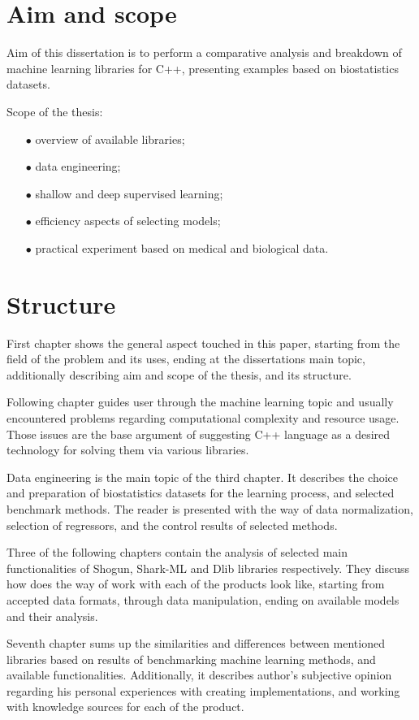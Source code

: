 \section{Aim and scope} %

Aim of this dissertation is to perform a comparative analysis and breakdown of machine learning libraries for C++, presenting examples based on biostatistics datasets.

Scope of the thesis:

\begin{itemize}
    \item [$\bullet$] overview of available libraries;
    \item [$\bullet$] data engineering;
    \item [$\bullet$] shallow and deep supervised learning;
    \item [$\bullet$] efficiency aspects of selecting models;
    \item [$\bullet$] practical experiment based on medical and biological data.
\end{itemize}

\section{Structure} %

First chapter shows the general aspect touched in this paper, starting from the field of the problem and its uses, ending at the dissertations main topic, additionally describing aim and scope of the thesis, and its structure. 

Following chapter guides user through the machine learning topic and usually encountered problems regarding computational complexity and resource usage. Those issues are the base argument of suggesting C++ language as a desired technology for solving them via various libraries.

Data engineering is the main topic of the third chapter. It describes the choice and preparation of biostatistics datasets for the learning process, and selected benchmark methods. The reader is presented with the way of data normalization, selection of regressors, and the control results of selected methods.

Three of the following chapters contain the analysis of selected main functionalities of Shogun, Shark-ML and Dlib libraries respectively. They discuss how does the way of work with each of the products look like, starting from accepted data formats, through data manipulation, ending on available models and their analysis.

Seventh chapter sums up the similarities and differences between mentioned libraries based on results of benchmarking machine learning methods, and available functionalities. Additionally, it describes author's subjective opinion regarding his personal experiences with creating implementations, and working with knowledge sources for each of the product.